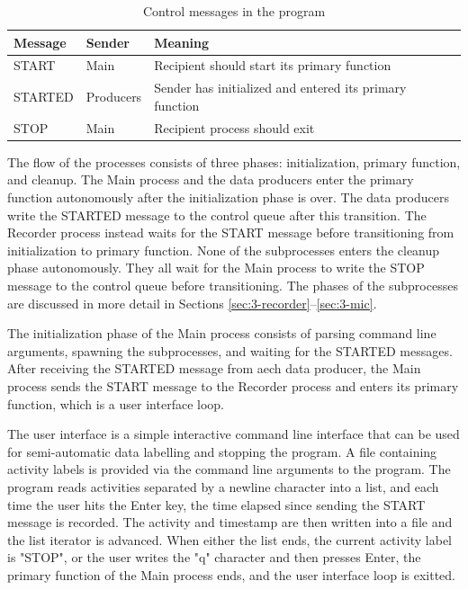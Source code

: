 \begin{table}[H]
    \centering
    \begin{tabular}{l l l}
        \toprule
        \textbf{Message} & \textbf{Sender} & \textbf{Meaning} \\
        \midrule
        START & Main & Recipient should start its primary function \\
        STARTED & Producers & Sender has initialized and entered its primary function \\
        STOP & Main & Recipient process should exit \\
        \bottomrule
    \end{tabular}
    \caption{Control messages in the program}
    \label{tab:control-messages}
\end{table}

The flow of the processes consists of three phases: initialization, primary function, and cleanup.
The Main process and the data producers enter the primary function autonomously after the initialization phase is over.
The data producers write the STARTED message to the control queue after this transition.
The Recorder process instead waits for the START message before transitioning from initialization to primary function.
None of the subprocesses enters the cleanup phase autonomously.
They all wait for the Main process to write the STOP message to the control queue before transitioning.
The phases of the subprocesses are discussed in more detail in Sections \ref{sec:3-recorder}--\ref{sec:3-mic}.

The initialization phase of the Main process consists of parsing command line arguments,
spawning the subprocesses, and waiting for the STARTED messages.
After receiving the STARTED message from aech data producer,
the Main process sends the START message to the Recorder process and enters its primary function, which is a user interface loop.

The user interface is a simple interactive command line interface that can be used for semi-automatic data labelling and stopping the program.
A file containing activity labels is provided via the command line arguments to the program.
The program reads activities separated by a newline character into a list,
and each time the user hits the Enter key,
the time elapsed since sending the START message is recorded.
The activity and timestamp are then written into a file and the list iterator is advanced.
When either the list ends, the current activity label is "STOP", or the user writes the "q" character and then presses Enter,
the primary function of the Main process ends, and the user interface loop is exitted.

